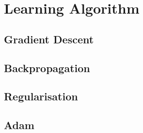 \section{Learning Algorithm}
\label{learning_algorithm}
\subsection{Gradient Descent}
\subsection{Backpropagation}
\subsection{Regularisation}
\label{early_stopping}
\subsection{Adam}